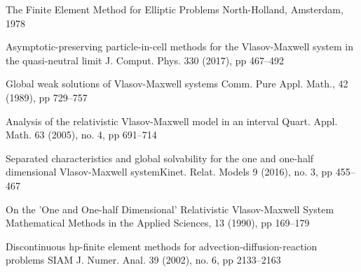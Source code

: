 \documentclass[reqno,a4paper]{amsart}
\theoremstyle{remark}
\numberwithin{equation}{section}
\begin{document}
\begin{thebibliography}{9999}
{The Finite Element Method for Elliptic Problems}
{North-Holland, Amsterdam, 1978}

{Asymptotic-preserving particle-in-cell methods for the Vlasov-Maxwell 
system in the quasi-neutral limit}{ J. Comput. Phys. 330 (2017), pp 467--492}

{Global weak solutions of Vlasov-Maxwell systems}
{Comm. Pure Appl. Math., 42 (1989), pp 729--757}




{Analysis of the relativistic Vlasov-Maxwell model in an interval}
{ Quart. Appl. Math. 63 (2005), no. 4, pp 691--714} 


{Separated characteristics and global solvability for the one and one-half dimensional Vlasov-Maxwell system}{Kinet. Relat. Models 9 (2016), no. 3, pp 455--467}


{On the ’One and One-half Dimensional’ Relativistic Vlasov-Maxwell System}
{Mathematical Methods in the Applied Sciences, 13 (1990), pp 169--179}


{Discontinuous hp-finite element methods for advection-diffusion-reaction problems}
{SIAM J. Numer. Anal. 39 (2002), no. 6, pp 2133--2163}


\end{thebibliography}
\end{document}
